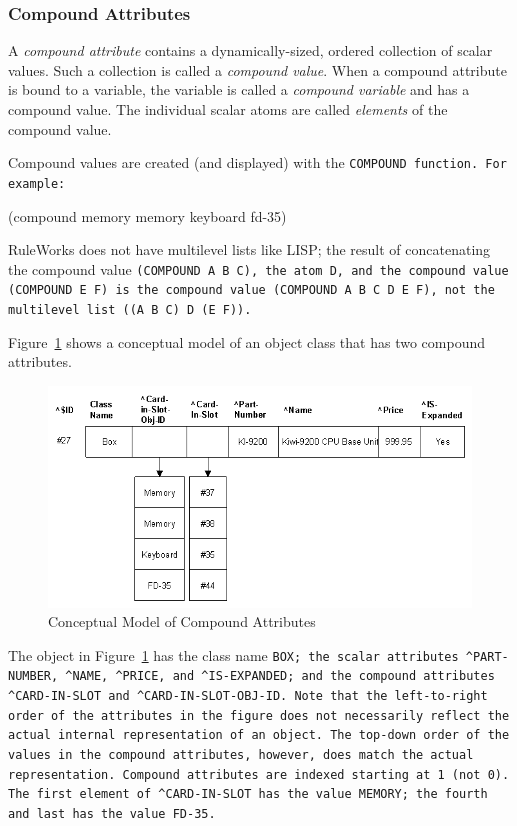 \subsubsection*{Compound Attributes}

A \emph{compound attribute} contains a dynamically-sized, ordered
collection of scalar values. Such a collection is called a
\emph{compound value}. When a compound attribute is bound to a
variable, the variable is called a \emph{compound variable} and has a
compound value. The individual scalar atoms are called \emph{elements}
of the compound value.

Compound values are created (and displayed) with the \tt{COMPOUND}
function. For example:
\begin{qv}
  (compound memory memory keyboard fd-35)
\end{qv}

RuleWorks does not have multilevel lists like LISP; the
result of concatenating the compound value \tt{(COMPOUND A B C)},
the atom \tt{D}, and the compound value \tt{(COMPOUND E F)} is the
compound value \tt{(COMPOUND A B C D E F)}, not the multilevel
list \tt{((A B C) D (E F))}.

Figure~\ref{f:2-6} shows a conceptual model of an object class that
has two compound attributes.

\begin{figure}[h]
  \centering
  \includegraphics[scale=0.7]{f2-6}
  \caption{Conceptual Model of Compound Attributes}
  \label{f:2-6}
\end{figure}

The object in Figure~\ref{f:2-6} has the class name \tt{BOX}; the scalar
attributes \verb|^PART-NUMBER|, \verb|^NAME|, \verb|^PRICE|, and
\verb|^IS-EXPANDED|; and the compound attributes \verb|^CARD-IN-SLOT|
and \verb|^CARD-IN-SLOT-OBJ-ID|. Note that the left-to-right order of
the attributes in the figure does not necessarily reflect the actual
internal representation of an object. The top-down order of the values
in the compound attributes, however, does match the actual
representation. Compound attributes are indexed starting at 1 (not
0). The first element of \verb|^CARD-IN-SLOT| has the value
\verb|MEMORY|; the fourth and last has the value \verb|FD-35|.

